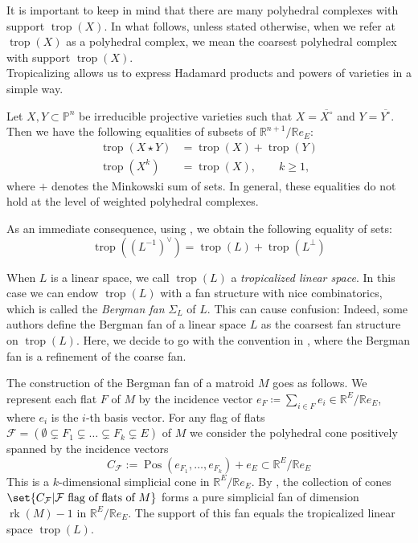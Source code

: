\documentclass[12pt,a4paper,english]{scrartcl}
\newcommand{\RR}{\mathbb{R}}
\newcommand{\KK}{\mathbb{K}}
\DeclareMathOperator{\pos}{Pos}
\DeclareMathOperator{\rank}{rk}
\DeclareMathOperator{\trop}{trop}
\begin{document}
It is important to keep in mind that there are many polyhedral complexes with support $\trop(X)$. In what follows, unless stated otherwise, when we refer at $\trop(X)$ as a polyhedral complex, we mean the coarsest polyhedral complex with support $\trop(X)$. 
\\

Tropicalizing allows us to express Hadamard products and powers of varieties in a simple way.

\begin{lemma}
\label{lem: tropLinSpaces}
Let $X,Y \subset \mathbb{P}^n$ be irreducible projective varieties such that $X = \overline{X^{\circ}}$ and $Y = \overline{Y^{\circ}}$. Then we have the following equalities of subsets of $\RR^{n+1}/\RR e_E$:
\begin{align*}
\trop(X \star Y) &= \trop(X) + \trop(Y) \\
\trop(X^k) &= \trop(X), \qquad k\geq 1,
\end{align*}
where $+$ denotes the Minkowski sum of sets. In general, these equalities do not hold at the level of weighted polyhedral complexes.
\end{lemma}

As an immediate consequence, using , we obtain the following equality of sets:
\[
\trop((L^{-1})^\vee) = \trop(L) + \trop(L^\perp)
\]

When $L$ is a linear space, we call $\trop(L)$ a \textit{tropicalized linear space}. In this case
we can endow $\trop(L)$ with a fan structure with nice combinatorics, which is called the \textit{Bergman fan} $\Sigma_L$ of $L$. This can cause confusion: Indeed, some authors define the Bergman fan of a linear space $L$ as the coarsest fan structure on $\trop(L)$. Here, we decide to go with the convention in \cite{Ardila2022}, where the Bergman fan is a refinement of the coarse fan.

The construction of the Bergman fan of a matroid $M$ goes as follows.
We represent each flat $F$ of $M$ by the incidence vector $ e_F \coloneq \sum_{i \in F}  e_i \in \RR^{E}/\RR e_E $, where $ e_i$ is the $i$-th basis vector. For any flag of flats $\mathcal{F} = (\emptyset \subsetneq F_{1} \subsetneq \dots \subsetneq F_k \subsetneq E)$ of $M$ we consider the polyhedral cone positively spanned by the incidence vectors
\[
C_{\mathcal{F}} := \pos( e_{F_1}, \dots,  e_{F_k}) +  e_E \subset \RR^{E}/\RR e_E
\]
This is a $k$-dimensional simplicial cone in $\RR^{E}/\RR e_E$.
By \cite[Theorem 4.2.6]{Maclagan2015}, the collection of cones $\set{ C_{\mathcal{F}} | \mathcal{F} \text{ flag of flats of }M}$ forms a pure simplicial fan of dimension $\rank(M)-1$ in $\RR^{E}/\RR e_E$. The support of this fan equals the tropicalized linear space $\trop(L)$.
\end{document}
